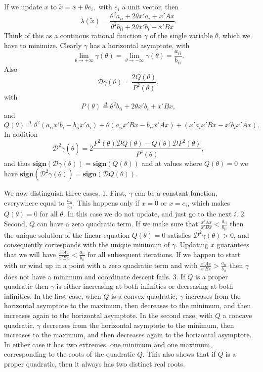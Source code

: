 \documentclass[
  12pt,
]{book}
\begin{document}
If we update \(x\)
to \(\tilde x=x+\theta e_i,\)
with \(e_i\) a unit vector, then
\[
\lambda(\tilde x)=
\frac{\theta^2a_{ii}+2\theta x'a_i+x'Ax}
{\theta^2b_{ii}+2\theta x'b_i+x'Bx}.
\]
Think of this as a continous rational function \(\gamma\) of the single variable \(\theta\), which we have to minimize.
Clearly \(\gamma\) has a horizontal asymptote, with
\[
\lim_{\theta\rightarrow+\infty}\gamma(\theta)=
\lim_{\theta\rightarrow-\infty}\gamma(\theta)=\frac{a_{ii}}{b_{ii}}.
\]
Also
\[
\mathcal{D}\gamma(\theta)=\frac{2Q(\theta)}{P^2(\theta)},
\]
with
\[
P(\theta)\mathop{=}\limits^{\Delta}\theta^2b_{ii}+2\theta x'b_i+x'Bx,
\]
and
\[
Q(\theta)\mathop{=}\limits^{\Delta}\theta^2(a_{ii}x'b_i-b_{ii}x'a_i)
+\theta(a_{ii}x'Bx-b_{ii}x'Ax)+
(x'a_ix'Bx-x'b_ix'Ax).
\]
In addition
\[
\mathcal{D}^2\gamma(\hat\theta)=2\frac{P^2(\theta)\mathcal{D}Q(\theta)-Q(\theta)\mathcal{D}P^2(\theta)}{P^4(\theta)},
\]
and thus \(\mathbf{sign}(\mathcal{D}\gamma(\theta))= \mathbf{sign}(Q(\theta))\) and at values
where \(Q(\theta)=0\) we have \(\mathbf{sign}(\mathcal{D}^2\gamma(\theta))= \mathbf{sign}(\mathcal{D}Q(\theta))\).

We now distinguish three cases.
1. First, \(\gamma\) can be a constant function, everywhere equal to \(\frac{a_{ii}}{b_{ii}}\). This happens only
if \(x=0\) or \(x=e_i\), which makes \(Q(\theta)=0\) for
all \(\theta\). In this case we do not update, and just go to the next \(i\).
2. Second, \(Q\) can have a zero quadratic term. If we make sure that \(\frac{x'Ax}{x'Bx}<\frac{a_{ii}}{b_{ii}}\)
then the unique solution of the linear equation \(Q(\theta)=0\)
satisfies \(\mathcal{D}^2\gamma(\theta)>0\), and consequently corresponds with the unique minimum of \(\gamma\). Updating \(x\) guarantees that we will have \(\frac{x'Ax}{x'Bx}<\frac{a_{ii}}{b_{ii}}\) for all subsequent iterations. If we happen to start with or wind up in a point with a zero quadratic term and with \(\frac{x'Ax}{x'Bx}>\frac{a_{ii}}{b_{ii}}\) then \(\gamma\) does not have a minimum and coordinate descent fails.
3. If \(Q\) is a proper quadratic then \(\gamma\) is either increasing at both infinities or decreasing at both infinities. In the first case, when \(Q\) is a convex quadratic, \(\gamma\) increases from the horizontal asymptote to the maximum, then decreases to the minimum, and then increases again to the horizontal asymptote. In the second case, with \(Q\) a concave quadratic, \(\gamma\) decreases from the horizontal asymptote to the minimum, then increases to the maximum, and then decreases again to the horizontal asymptote. In either case it has two extremes, one minimum and one maximum, corresponding to the roots of the quadratic \(Q\). This also shows that if \(Q\) is a proper quadratic, then it always has two distinct real roots.
\end{document}
